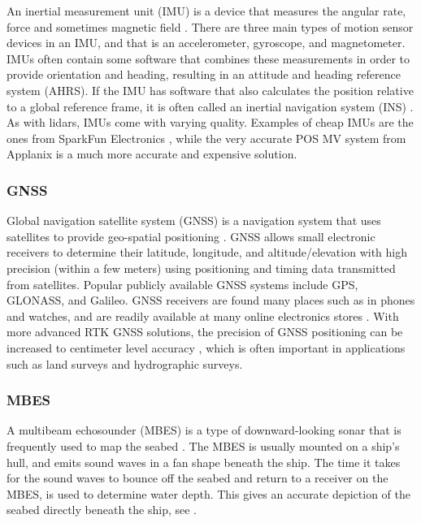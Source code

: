 An inertial measurement unit (IMU) is a device that measures the angular rate, force and sometimes magnetic field \citep{wiki:imu}. There are three main types of motion sensor devices in an IMU, and that is an accelerometer, gyroscope, and magnetometer. IMUs often contain some software that combines these measurements in order to provide orientation and heading, resulting in an attitude and heading reference system (AHRS). If the IMU has software that also calculates the position relative to a global reference frame, it is often called an inertial navigation system (INS) \citep{wiki:ins}. As with lidars, IMUs come with varying quality. Examples of cheap IMUs are the ones from SparkFun Electronics \citep{website:sparkfun}, while the very accurate POS MV \citep{website:applanix} system from Applanix is a much more accurate and expensive solution.

\subsubsection{GNSS}

Global navigation satellite system (GNSS) is a navigation system that uses satellites to provide geo-spatial positioning \citep{wiki:gnss}. GNSS allows small electronic receivers to determine their latitude, longitude, and altitude/elevation with high precision (within a few meters) using positioning and timing data transmitted from satellites. Popular publicly available GNSS systems include GPS, GLONASS, and Galileo. GNSS receivers are found many places such as in phones and watches, and are readily available at many online electronics stores \citep{website:sparkfun}. With more advanced RTK GNSS solutions, the precision of GNSS positioning can be increased to centimeter level accuracy \citep{wiki:rtk}, which is often important in applications such as land surveys and hydrographic surveys.

\subsubsection{MBES}

A multibeam echosounder (MBES) is a type of downward-looking sonar that is frequently used to map the seabed \citep{wiki:mbes}. The MBES is usually mounted on a ship's hull, and emits sound waves in a fan shape beneath the ship. The time it takes for the sound waves to bounce off the seabed and return to a receiver on the MBES, is used to determine water depth. This gives an accurate depiction of the seabed directly beneath the ship, see .

